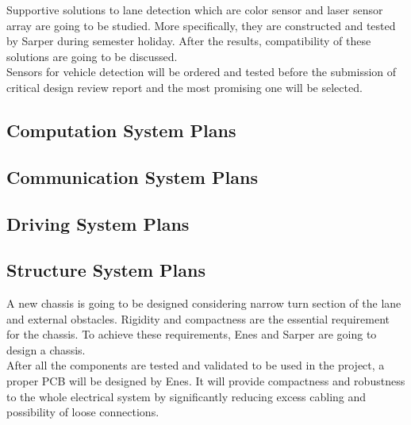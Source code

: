 \documentclass[a4paper,12pt]{article}
\begin{document}
	Supportive solutions to lane detection which are color sensor and laser sensor array are going to be studied. More specifically, they are constructed and tested by Sarper during semester holiday. After the results, compatibility of these solutions are going to be discussed.\\
	
	Sensors for vehicle detection will be ordered and tested before the submission of critical design review report and the most promising one will be selected. 
	
	\subsection{Computation System Plans}
	\subsection{Communication System Plans}
	\subsection{Driving System Plans}
	\subsection{Structure System Plans}
	
	A new chassis is going to be designed considering narrow turn section of the lane and  external obstacles. Rigidity and compactness are  the essential requirement for the chassis. To achieve these requirements, Enes and Sarper are going to design a chassis.\\
	
	After all the components are tested and validated to be used in the project, a proper PCB will be designed by Enes. It will provide compactness and robustness to the whole electrical system by significantly reducing excess cabling and possibility of loose connections.
	
\end{document}
